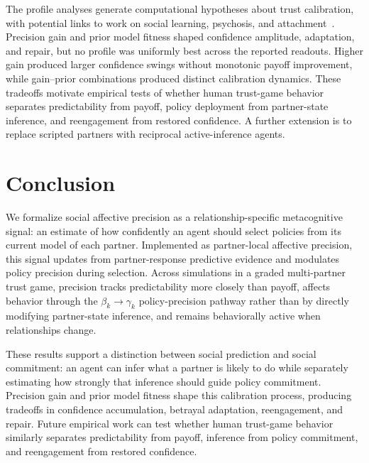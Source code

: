The profile analyses generate computational hypotheses about trust calibration, with potential links to work on social learning, psychosis, and attachment~\cite{Adams2013ComputationalPsychosis,Behrens2008SocialLearning,Cittern2018AttachmentActiveInference}. Precision gain and prior model fitness shaped confidence amplitude, adaptation, and repair, but no profile was uniformly best across the reported readouts. Higher gain produced larger confidence swings without monotonic payoff improvement, while gain--prior combinations produced distinct calibration dynamics. These tradeoffs motivate empirical tests of whether human trust-game behavior separates predictability from payoff, policy deployment from partner-state inference, and reengagement from restored confidence. A further extension is to replace scripted partners with reciprocal active-inference agents.

\section{Conclusion}
\label{sec:conclusion}

We formalize social affective precision as a relationship-specific metacognitive signal: an estimate of how confidently an agent should select policies from its current model of each partner. Implemented as partner-local affective precision, this signal updates from partner-response predictive evidence and modulates policy precision during selection. Across simulations in a graded multi-partner trust game, precision tracks predictability more closely than payoff, affects behavior through the $\beta_k \rightarrow \gamma_k$ policy-precision pathway rather than by directly modifying partner-state inference, and remains behaviorally active when relationships change.

These results support a distinction between social prediction and social commitment: an agent can infer what a partner is likely to do while separately estimating how strongly that inference should guide policy commitment. Precision gain and prior model fitness shape this calibration process, producing tradeoffs in confidence accumulation, betrayal adaptation, reengagement, and repair. Future empirical work can test whether human trust-game behavior similarly separates predictability from payoff, inference from policy commitment, and reengagement from restored confidence.
